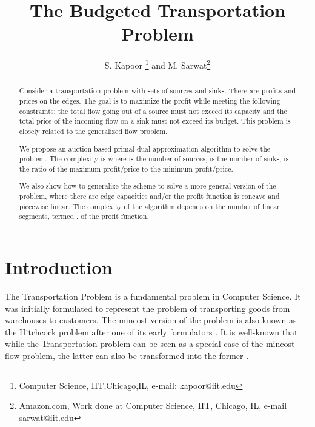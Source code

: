 \documentclass[11pt]{article}
\begin{document}
\title{The Budgeted Transportation Problem}
\author{S. Kapoor \thanks{Computer Science, IIT,Chicago,IL, e-mail: kapoor@iit.edu} and M. Sarwat\thanks{Amazon.com, Work done at Computer Science, IIT, Chicago, IL, e-mail sarwat@iit.edu}}
\date{}
\maketitle



\begin{abstract}
Consider a transportation problem with sets of sources and sinks. There
are profits and prices on the edges. The goal is to maximize the profit while meeting
the following constraints; the total flow going out of a source must not exceed its
capacity and the total price of the incoming flow on a sink must not exceed its budget.
This problem is closely related to the generalized flow problem.



We propose an auction based primal dual approximation algorithm to solve the problem.
The complexity is  where  is the number
of sources,  is the number of sinks,  is the ratio of the
maximum profit/price  to the minimum profit/price.

We also show how to generalize the scheme to solve a more general version of the
problem, where there are edge capacities and/or the profit function is concave and 
piecewise linear. The complexity of the algorithm depends on  the
number of linear segments, termed , of the profit function.


\end{abstract}



\section{Introduction}
\label{chap_BT}





The Transportation Problem is a fundamental problem in Computer Science. It was 
initially formulated to represent the problem of transporting goods from warehouses to customers.
The mincost version of the problem is also known as the Hitchcock problem after one of its
early formulators \cite{hitchcock41dist}. It is well-known
that while the Transportation problem
can be seen as a special case of the mincost flow problem, the latter can also be transformed 
into the former \cite{papadimitriou}.
\end{document}
